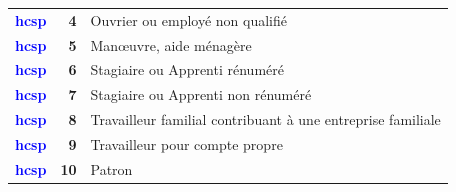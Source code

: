 \documentclass[
]{article}
\begin{document}
\begin{longtable}[t]{>{}l>{}r>{\raggedright\arraybackslash}p{8cm}}
\textcolor{blue}{\textbf{hcsp}} & \textbf{4} & Ouvrier ou employé non qualifié\\
\textcolor{blue}{\textbf{hcsp}} & \textbf{5} & Manœuvre, aide ménagère\\
\textcolor{blue}{\textbf{hcsp}} & \textbf{6} & Stagiaire ou Apprenti rénuméré\\
\textcolor{blue}{\textbf{hcsp}} & \textbf{7} & Stagiaire ou Apprenti non rénuméré\\
\addlinespace
\textcolor{blue}{\textbf{hcsp}} & \textbf{8} & Travailleur familial contribuant à une entreprise familiale\\
\textcolor{blue}{\textbf{hcsp}} & \textbf{9} & Travailleur pour compte propre\\
\textcolor{blue}{\textbf{hcsp}} & \textbf{10} & Patron\\
\bottomrule
\end{longtable}
\end{document}
